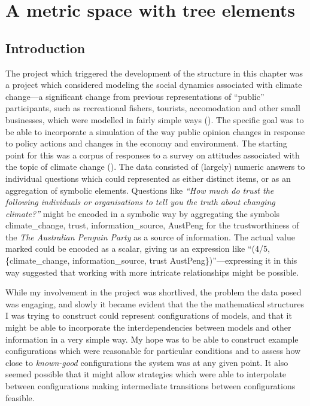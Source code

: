 \chapter[A METRIC SPACE WITH TREE ELEMENTS] {A metric space with tree elements}\label{treering}
\WeAreOn{\cfour}

\section{Introduction}
The project which triggered the development of the structure in this
chapter was a project which considered modeling the social dynamics
associated with climate change---a significant change from previous
representations of ``public'' participants, such as recreational
fishers, tourists, accomodation and other small businesses, which were
modelled in fairly simple ways (\cite{Fulton2011ningaloo,Gray2014}).
The specific goal was to be able to incorporate a simulation of the
way public opinion changes in response to policy actions and changes
in the economy and environment.  The starting point for this was a
corpus of responses to a survey on attitudes associated with the topic
of climate change (\cite{boschetti2012}). The data consisted of
(largely) numeric answers to individual questions which could
represented as either distinct items, or as an aggregation of symbolic
elements.  Questions like \textsl{``How much do trust the following
individuals or organisations to tell you the truth about changing
climate?''\/} might be encoded in a symbolic way by aggregating the
symbols \textsf{climate\_change, trust, information\_source, AustPeng}
for the trustworthiness of the \emph{The Australian Penguin Party\/} as a source
of information. The actual value marked could be encoded as a scalar,
giving us an expression like ``(\textsf{4/5, \{climate\_change,
information\_source, trust AustPeng\}})''---expressing it in this way
suggested that working with more intricate relationships might be
possible.

While my involvement in the project was shortlived, the problem the
data posed was engaging, and slowly it became evident that the the
mathematical structures I was trying to construct could represent
configurations of models, and that it might be able to incorporate the
interdependencies between models and other information in a very
simple way.  My hope was to be able to construct example
configurations which were reasonable for particular conditions and to
assess how close to \emph{known-good} configurations the system was at
any given point.  It also seemed possible that it might allow
strategies which were able to interpolate between configurations
making intermediate transitions between configurations feasible.

